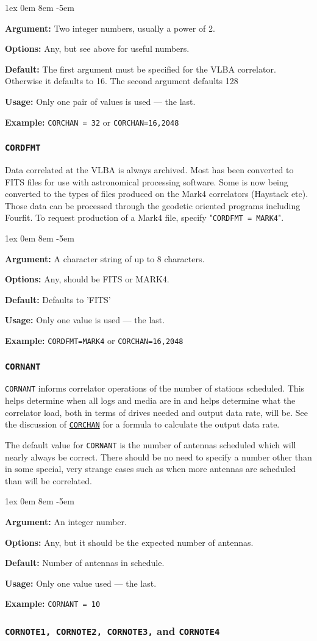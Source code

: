 \documentclass{report}
\newcommand{\rcwbox}[5]{
  \begin{list}{}{\parsep 1ex  \itemsep 0em
                 \leftmargin 8em  \itemindent -5em }
    \item {\bf Argument:} #1
    \item {\bf Options:}  #2
    \item {\bf Default:}  #3
    \item {\bf Usage:}    #4
    \item {\bf Example:}  #5
  \end{list}
}
\begin{document}
\rcwbox
{Two integer numbers, usually a power of 2.}
{Any, but see above for useful numbers.}
{The first argument must be specified for the VLBA correlator.
Otherwise it defaults to 16.  The second argument defaults 128}
{Only one pair of values is used --- the last.}
{{\tt CORCHAN = 32} or {\tt CORCHAN=16,2048}}


\subsubsection{\label{MP:CORDFMT}{\tt CORDFMT}}

Data correlated at the VLBA is always archived.  Most has been
converted to FITS files for use with astronomical processing software.
Some is now being converted to the types of files produced on the
Mark4 correlators (Haystack etc).  Those data can be processed through
the geodetic oriented programs including Fourfit.  To request production
of a Mark4 file, specify "{\tt CORDFMT = MARK4}".

\rcwbox
{A character string of up to 8 characters.}
{Any, should be FITS or MARK4.}
{Defaults to 'FITS'}
{Only one value is used --- the last.}
{{\tt CORDFMT=MARK4} or {\tt CORCHAN=16,2048}}


\subsubsection{\label{MP:CORNANT}{\tt CORNANT}}

{\tt CORNANT} informs correlator operations of the number of stations
scheduled.  This helps determine when all logs and media are in and
helps determine what the correlator load, both in terms of drives
needed and output data rate, will be.  See the discussion of
{\hyperref[MP:CORCHAN]{{\tt CORCHAN}}} for a formula to calculate
the output data rate.

The default value for {\tt CORNANT} is the number of antennas scheduled
which will nearly always be correct.  There should be no need to specify
a number other than in some special, very strange cases such as when more
antennas are scheduled than will be correlated.

\rcwbox
{An integer number.}
{Any, but it should be the expected number of antennas.}
{Number of antennas in schedule.}
{Only one value used --- the last.}
{{\tt CORNANT = 10}}


\subsubsection{\label{MP:CORNOTE}
{\tt CORNOTE1, CORNOTE2, CORNOTE3,} and {\tt CORNOTE4}}
\end{document}
